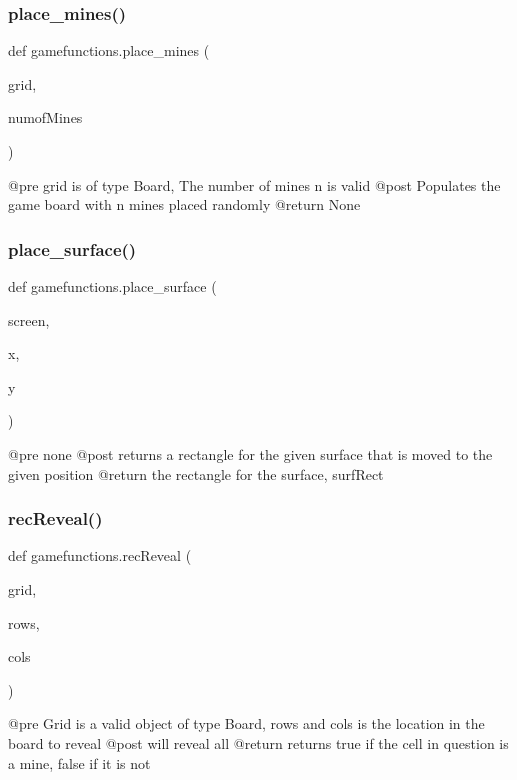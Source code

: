 \subsubsection{\texorpdfstring{place\+\_\+mines()}{place\_mines()}}
{\footnotesize\ttfamily def gamefunctions.\+place\+\_\+mines (\begin{DoxyParamCaption}\item[{}]{grid,  }\item[{}]{numof\+Mines }\end{DoxyParamCaption})}

\begin{DoxyVerb}@pre    grid is of type Board, The number of mines n is valid
    @post   Populates the game board with n mines placed randomly
    @return None
\end{DoxyVerb}
 \mbox{\label{namespacegamefunctions_a109b9daf1366f60cec625c3ff29fd7dd}} 
\subsubsection{\texorpdfstring{place\+\_\+surface()}{place\_surface()}}
{\footnotesize\ttfamily def gamefunctions.\+place\+\_\+surface (\begin{DoxyParamCaption}\item[{}]{screen,  }\item[{}]{x,  }\item[{}]{y }\end{DoxyParamCaption})}

\begin{DoxyVerb}@pre    none
    @post   returns a rectangle for the given surface that is moved to the given position
    @return the rectangle for the surface, surfRect
\end{DoxyVerb}
 \mbox{\label{namespacegamefunctions_a7d344c04c49594d58ba15b6673f9f8d9}} 
\subsubsection{\texorpdfstring{rec\+Reveal()}{recReveal()}}
{\footnotesize\ttfamily def gamefunctions.\+rec\+Reveal (\begin{DoxyParamCaption}\item[{}]{grid,  }\item[{}]{rows,  }\item[{}]{cols }\end{DoxyParamCaption})}

\begin{DoxyVerb}@pre    Grid is a valid object of type Board, rows and cols is the location in the board to reveal
    @post   will reveal all
    @return returns true if the cell in question is a mine, false if it is not
\end{DoxyVerb}
 